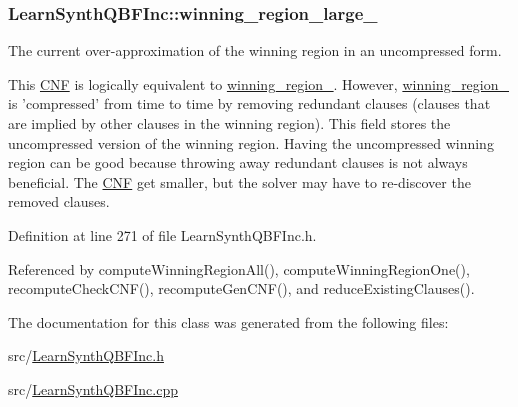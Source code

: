 \hypertarget{classLearnSynthQBFInc_a5ef45d9d77b566fca1c5a1e6041f7c86}{
\subsubsection[{winning\-\_\-region\-\_\-large\-\_\-}]{ Learn\-Synth\-Q\-B\-F\-Inc\-::winning\-\_\-region\-\_\-large\-\_\-\hspace{0.3cm}{\ttfamily [protected]}}}\label{classLearnSynthQBFInc_a5ef45d9d77b566fca1c5a1e6041f7c86}


The current over-\/approximation of the winning region in an uncompressed form. 

This \hyperlink{classCNF}{C\-N\-F} is logically equivalent to \hyperlink{classLearnSynthQBFInc_abc3503bdb6be7053a7c3d3d7e57858d6}{winning\-\_\-region\-\_\-}. However, \hyperlink{classLearnSynthQBFInc_abc3503bdb6be7053a7c3d3d7e57858d6}{winning\-\_\-region\-\_\-} is 'compressed' from time to time by removing redundant clauses (clauses that are implied by other clauses in the winning region). This field stores the uncompressed version of the winning region. Having the uncompressed winning region can be good because throwing away redundant clauses is not always beneficial. The \hyperlink{classCNF}{C\-N\-F} get smaller, but the solver may have to re-\/discover the removed clauses. 

Definition at line 271 of file Learn\-Synth\-Q\-B\-F\-Inc.\-h.



Referenced by compute\-Winning\-Region\-All(), compute\-Winning\-Region\-One(), recompute\-Check\-C\-N\-F(), recompute\-Gen\-C\-N\-F(), and reduce\-Existing\-Clauses().



The documentation for this class was generated from the following files\-:\begin{DoxyCompactItemize}
\item 
src/\hyperlink{LearnSynthQBFInc_8h}{Learn\-Synth\-Q\-B\-F\-Inc.\-h}\item 
src/\hyperlink{LearnSynthQBFInc_8cpp}{Learn\-Synth\-Q\-B\-F\-Inc.\-cpp}\end{DoxyCompactItemize}
